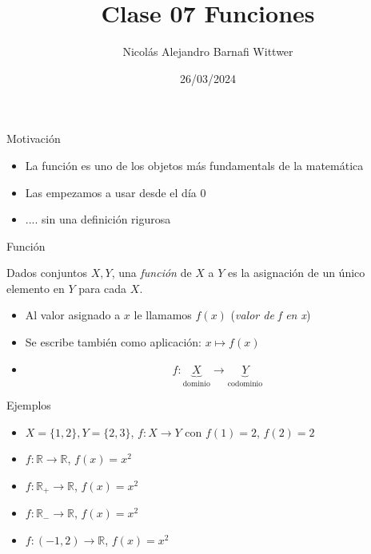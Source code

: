 \documentclass[14pt,aspectratio=169,xcolor=dvipsnames]{beamer}
\title[short title]{Clase 07 Funciones}
\subtitle{}
\author[NA Barnafi] {Nicolás Alejandro Barnafi Wittwer}
\institute[UC|CMM] 
{
    Pontificia Universidad Católica de Chile \\
    Centro de Modelamiento Matemático
}
\date{26/03/2024}
\begin{document}
\begin{frame}
    \maketitle
\end{frame}
\begin{frame}{Motivación}
    \begin{itemize}
        \item La función es uno de los objetos más fundamentals de la matemática
        \item Las empezamos a usar desde el día 0 
        \item .... sin una definición rigurosa
    \end{itemize}
    \vspace{1cm}
\end{frame}
\begin{frame}{Función}
    \begin{block}{}
        Dados conjuntos $X, Y$, una \emph{función} de $X$ a $Y$ es la asignación de un único elemento en $Y$ para cada $X$.
    \end{block}
    \begin{itemize}
        \item Al valor asignado a $x$ le llamamos $f(x)$ (\emph{valor de f en x})
        \item Se escribe también como aplicación: $x\mapsto f(x)$
        \item 
            $$ f: \underbrace{X}_\text{dominio} \to \underbrace{Y}_\text{codominio} $$
    \end{itemize}
\end{frame}
\begin{frame}{Ejemplos}
    \begin{itemize}
        \item $X=\{1,2\}, Y=\{2,3\}$, $f:X\to Y$ con $f(1)=2$, $f(2)=2$
        \item $f:\mathbb R \to \mathbb R$, $f(x) = x^2$
        \item $f:\mathbb R_+ \to \mathbb R$, $f(x) = x^2$
        \item $f:\mathbb R_- \to \mathbb R$, $f(x) = x^2$
        \item $f:(-1,2) \to \mathbb R$, $f(x) = x^2$
    \end{itemize}
\end{frame}
\end{document}
